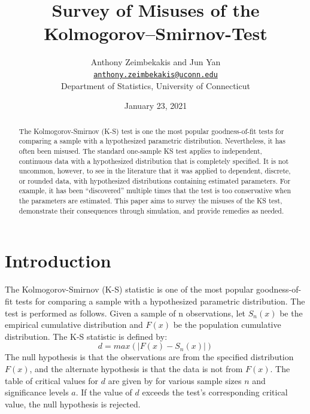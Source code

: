 \documentclass[12pt, letterpaper, titlepage]{article}
\title{Survey of Misuses of the Kolmogorov–Smirnov-Test}
\author{Anthony Zeimbekakis and Jun Yan\\
\href{mailto:anthony.zeimbekakis@uconn.edu}{\nolinkurl{anthony.zeimbekakis@uconn.edu}}\\
Department of Statistics, University of Connecticut}
\date{January 23, 2021}
\begin{document}
\maketitle

\doublespace

\begin{abstract}
The Kolmogorov-Smirnov (K-S) test is one the most popular goodness-of-fit tests for 
comparing a sample with a hypothesized parametric distribution. Nevertheless, it has 
often been misused. The standard one-sample KS test applies to independent, continuous 
data with a hypothesized distribution that is completely specified. It is not uncommon, 
however, to see in the literature that it was applied to dependent, discrete, or 
rounded data, with hypothesized distributions containing estimated parameters. 
For example, it has been “discovered” multiple times that the test is too conservative 
when the parameters are estimated. This paper aims to survey the misuses of the KS test, 
demonstrate their consequences through simulation, and provide remedies as needed.
\end{abstract}


\hypertarget{sec:intro}{%
\section{Introduction}\label{sec:intro}}

The Kolmogorov-Smirnov (K-S) statistic is one of the most popular goodness-of-fit 
tests for comparing a sample with a hypothesized parametric distribution. The test is 
performed as follows. Given a sample of n observations, let $S_{n}(x)$ be the empirical 
cumulative distribution and $F(x)$ be the population cumulative distribution. The K-S 
statistic is defined by: \[d = max(\lvert F(x)-S_{n}(x) \rvert)\] The null hypothesis 
is that the observations are from the specified distribution $F(x)$, and the 
alternate hypothesis is that the data is not from $F(x)$. The table of critical 
values for $d$ are given by \citet{Massey} for various sample sizes $n$ and significance 
levels $a$. If the value of $d$ exceeds the test's corresponding critical value, 
the null hypothesis is rejected.
\end{document}
